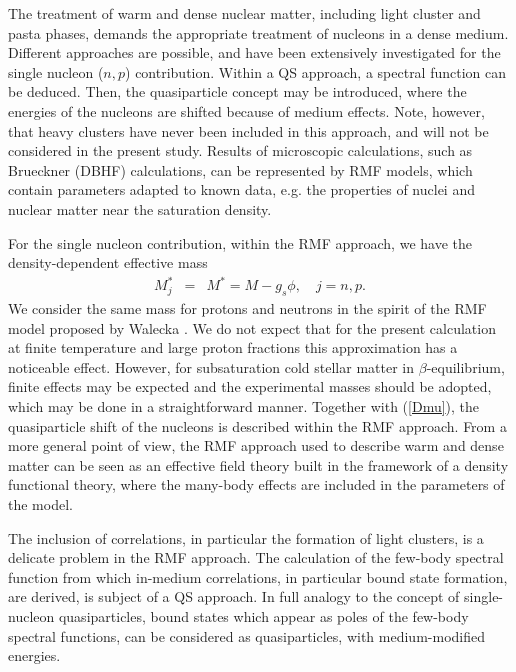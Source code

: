 \documentclass[aps,prc,nofootinbib,twocolumn,showpacs]{revtex4-1}
\begin{document}
The treatment of warm and dense nuclear matter, including light cluster and pasta phases,
demands the appropriate treatment of nucleons in a dense medium. Different approaches are 
possible, and have been extensively investigated for the single nucleon ($n,p$) contribution.
Within a QS approach, a spectral function can be deduced. Then, the quasiparticle concept may 
be introduced, where the energies of the nucleons are shifted because
of medium effects.  Note, however, that  heavy clusters have never
  been included in this approach, and will not be considered in
the present study.
Results of microscopic calculations, such as Brueckner (DBHF) calculations, can be represented by
RMF models, which contain parameters adapted to known data, e.g. the properties of nuclei and 
nuclear matter near the saturation density.

For the single nucleon contribution, within the RMF approach, we have the density-dependent effective mass
\begin{eqnarray}
M^{*}_j &=&M^*=M -g_{s}\phi, \quad j=n,p .
\label{Mstar}
\end{eqnarray}
 We consider the same  mass for protons and neutrons in
the spirit of the RMF model proposed by Walecka
\cite{walecka}. We do not expect that for the present calculation
at finite temperature and large proton fractions this approximation
has a noticeable effect. However, for subsaturation cold stellar  matter in
$\beta$-equilibrium, finite effects may be expected and the experimental masses
should be adopted, which may be done in a straightforward manner. 
Together with (\ref{Dmu}), the quasiparticle shift of the nucleons is
described within the RMF approach.
 From a more general point of view, the  RMF approach used to describe  warm
and dense matter can be seen as an effective field theory built in the
framework of a density functional theory, where the many-body effects
are included in the parameters of the model.

The inclusion of correlations, in particular the formation of light clusters, is a delicate problem in the RMF approach.
The calculation of the few-body spectral function from which in-medium correlations, in particular bound state formation,
are derived, is subject of a QS approach. In full analogy to the concept of single-nucleon quasiparticles, bound states 
which appear as poles of the few-body spectral functions, can be considered as quasiparticles, with medium-modified 
energies.
\end{document}
